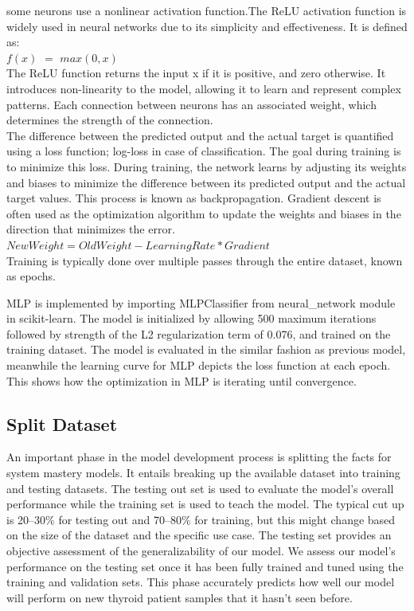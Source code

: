 some neurons use a nonlinear activation function.The ReLU activation function is widely used in neural networks due to its simplicity and effectiveness. It is defined as:\\
$f(x)$ $=$ $max(0,x)$\\
The ReLU function returns the input x if it is positive, and zero otherwise. It introduces non-linearity to the model, allowing it to learn and represent complex patterns.
Each connection between neurons has an associated weight, which determines the strength of the connection.\\
The difference between the predicted output and the actual target is quantified using a loss function; log-loss in case of classification. The goal during training is to minimize this loss.
During training, the network learns by adjusting its weights and biases to minimize the difference between its predicted output and the actual target values. This process is known as backpropagation. Gradient descent is often used as the optimization algorithm to update the weights and biases in the direction that minimizes the error.\\
$New Weight = Old Weight - Learning Rate * Gradient$\\
Training is typically done over multiple passes through the entire dataset, known as epochs\cite{inproceedings}.

MLP is implemented by importing MLPClassifier from neural\_network module in scikit-learn. The model is initialized by allowing 500 maximum iterations followed by strength of the L2 regularization term of 0.076, and trained on the training dataset. The model is evaluated in the similar fashion as previous model, meanwhile the learning curve for MLP depicts the loss function at each epoch. This shows how the optimization in MLP is iterating until convergence.

\subsection{Split Dataset}
An important phase in the model development process is splitting the facts for system mastery models. It entails breaking up the available dataset into training and testing datasets.
The testing out set is used to evaluate the model's overall performance while the training set is used to teach the model. The typical cut up is 20–30\% for testing out and 70–80\% for training, but this might change based on the size of the dataset and the specific use case. 
The testing set provides an objective assessment of the generalizability of our model. We assess our model's performance on the testing set once it has been fully trained and tuned using the training and validation sets. This phase accurately predicts how well our model will perform on new thyroid patient samples that it hasn't seen before.
